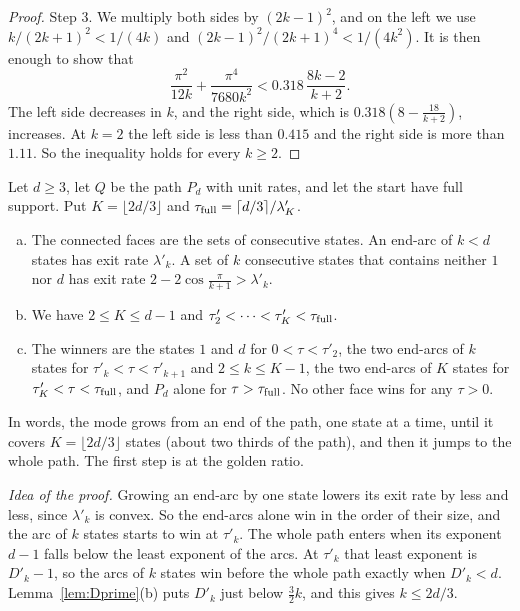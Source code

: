 \documentclass[EJP,preprint]{ejpecp}
\begin{document}
\begin{proof}
Step 3. We multiply both sides by $(2k-1)^2$, and on the left we use
$k/(2k+1)^2<1/(4k)$ and $(2k-1)^2/(2k+1)^4<1/(4k^2)$. It is then enough to show
that
\[
 \frac{\pi^2}{12k}+\frac{\pi^4}{7680k^2}<0.318\,\frac{8k-2}{k+2}.
\]
The left side decreases in $k$, and the right side, which is
$0.318(8-\frac{18}{k+2})$, increases. At $k=2$ the left side is less than
$0.415$ and the right side is more than $1.11$. So the inequality holds for
every $k\ge2$.
\end{proof}

\begin{proposition}\label{prop:paths}
Let $d\ge3$, let $Q$ be the path $P_d$ with unit rates, and let the start have
full support. Put $K=\lfloor2d/3\rfloor$ and
$\tau_{\rm full}=\lceil d/3\rceil/\lambda'_K$.
\begin{enumerate}[(a)]
\item The connected faces are the sets of consecutive states. An end-arc of
$k<d$ states has exit rate $\lambda'_k$. A set of $k$ consecutive states that
contains neither $1$ nor $d$ has exit rate $2-2\cos\frac\pi{k+1}>\lambda'_k$.
\item We have $2\le K\le d-1$ and
$\tau'_2<\dots<\tau'_K<\tau_{\rm full}$.
\item The winners are the states $1$ and $d$ for $0<\tau<\tau'_2$, the two
end-arcs of $k$ states for $\tau'_k<\tau<\tau'_{k+1}$ and $2\le k\le K-1$, the
two end-arcs of $K$ states for $\tau'_K<\tau<\tau_{\rm full}$, and $P_d$ alone
for $\tau>\tau_{\rm full}$. No other face wins for any $\tau>0$.
\end{enumerate}
\end{proposition}

In words, the mode grows from an end of the path, one state at a time, until
it covers $K=\lfloor2d/3\rfloor$ states (about two thirds of the path), and then it jumps to the whole path. The
first step is at the golden ratio.

\emph{Idea of the proof.} Growing an end-arc by one state lowers its exit rate
by less and less, since $\lambda'_k$ is convex. So the end-arcs alone win in
the order of their size, and the arc of $k$ states starts to win at
$\tau'_k$. The whole path enters when its exponent $d-1$ falls below the least
exponent of the arcs. At $\tau'_k$ that least exponent is $D'_k-1$, so the
arcs of $k$ states win before the whole path exactly when $D'_k<d$.
Lemma~\ref{lem:Dprime}(b) puts $D'_k$ just below $\frac32k$, and this gives
$k\le2d/3$.
\end{document}
